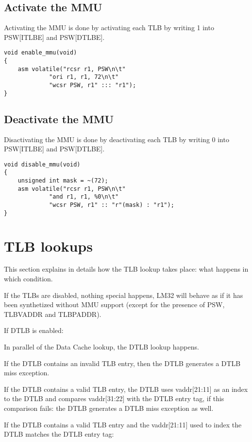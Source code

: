 \documentclass[a4paper,11pt]{article}
\begin{document}
\subsection{Activate the MMU}

Activating the MMU is done by activating each TLB by writing 1 into PSW[ITLBE] and PSW[DTLBE].

\begin{lstlisting}
void enable_mmu(void)
{
	asm volatile("rcsr r1, PSW\n\t"
		     "ori r1, r1, 72\n\t"
		     "wcsr PSW, r1" ::: "r1");
}
\end{lstlisting}

\subsection{Deactivate the MMU}

Disactivating the MMU is done by deactivating each TLB by writing 0 into PSW[ITLBE] and PSW[DTLBE].

\begin{lstlisting}
void disable_mmu(void)
{
	unsigned int mask = ~(72);
	asm volatile("rcsr r1, PSW\n\t"
		     "and r1, r1, %0\n\t"
		     "wcsr PSW, r1" :: "r"(mask) : "r1");
}
\end{lstlisting}

\section{TLB lookups}

This section explains in details how the TLB lookup takes place: what happens in which condition.

If the TLBs are disabled, nothing special happens, LM32 will behave as if it has been synthetized without MMU support (except for the presence of PSW, TLBVADDR and TLBPADDR).

If DTLB is enabled:

In parallel of the Data Cache lookup, the DTLB lookup happens.

If the DTLB contains an invalid TLB entry, then the DTLB generates a DTLB miss exception.

If the DTLB contains a valid TLB entry, the DTLB uses vaddr[21:11] as an index to the DTLB and compares vaddr[31:22] with the DTLB entry tag, if this comparison fails: the DTLB generates a DTLB miss exception as well.

If the DTLB contains a valid TLB entry and the vaddr[21:11] used to index the DTLB matches the DTLB entry tag:
\end{document}
